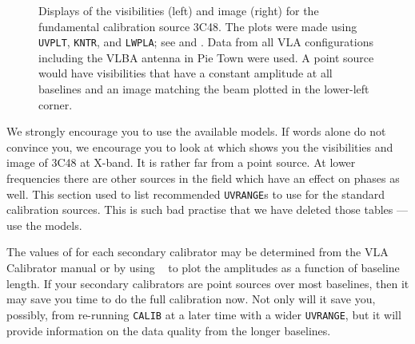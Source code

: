 \begin{figure}
\centering
\caption[3C48 at X-band]{Displays of the visibilities (left) and
image (right) for the fundamental calibration source 3C48\@.  The
plots were made using {\tt UVPLT}, {\tt KNTR}, and {\tt LWPLA};
see  and .  Data from all VLA configurations
including the VLBA antenna in Pie Town were used.  A point source
would have visibilities that have a constant amplitude at all
baselines and an image matching the beam plotted in the lower-left
corner.}
\label{fig:3C48_X}
\end{figure}


We strongly encourage you to use the available models.  If words alone
do not convince you, we encourage you to look at  which
shows you the visibilities and image of 3C48 at X-band.  It is rather
far from a point source.  At lower frequencies there are other sources
in the field which have an effect on phases as well.  This section
used to list recommended {\tt UVRANGE}s to use for the standard
calibration sources.  This is such bad practise that we have deleted
those tables --- use the models.

   The values of {\tt {}} for each secondary calibrator
may be determined from the VLA Calibrator manual or by using {\tt
{}} to plot the amplitudes as a function of baseline length.
If your secondary calibrators are point sources over most baselines,
then it may save you time to do the full calibration now.  Not only
will it save you, possibly, from re-running {\tt CALIB} at a later
time with a wider {\tt UVRANGE}, but it will provide information on
the data quality from the longer baselines.

